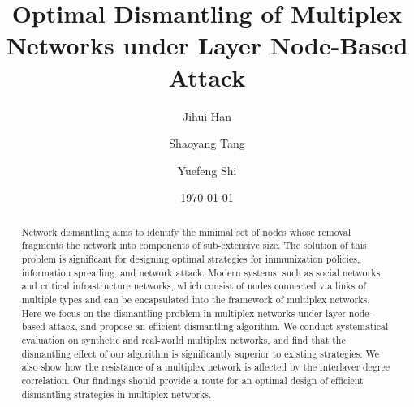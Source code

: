 \documentclass[%
 aip,
 cha,
 amsmath,amssymb,
 reprint,%
]{revtex4-1}
\begin{document}

\title{Optimal Dismantling of Multiplex Networks under Layer Node-Based Attack}

\author{Jihui Han}

\author{Shaoyang Tang}%
%

\author{Yuefeng Shi}
%

\date{\today}%

\begin{abstract}
Network dismantling aims to identify the minimal set of nodes whose removal fragments the network into components of sub-extensive size. The solution of this problem is significant for designing optimal strategies for immunization policies, information spreading, and network attack. Modern systems, such as social networks and critical infrastructure networks, which consist of nodes connected via links of multiple types and can be encapsulated into the framework of multiplex networks. Here we focus on the dismantling problem in multiplex networks under layer node-based attack, and propose an efficient dismantling algorithm. We conduct systematical evaluation on synthetic and real-world multiplex networks, and find that the dismantling effect of our algorithm is significantly superior to existing strategies. We also show how the resistance of a multiplex network is affected by the interlayer degree correlation. Our findings should provide a route for an optimal design of efficient dismantling strategies in multiplex networks.


\end{abstract}
\end{document}
